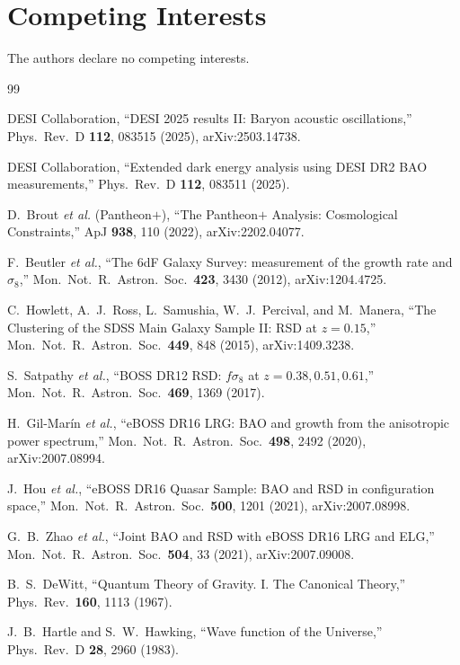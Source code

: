 \documentclass[aps,prd,twocolumn,amsmath,amssymb,nofootinbib,superscriptaddress]{revtex4-2}
\begin{document}
\section*{Competing Interests}
The authors declare no competing interests.

\begin{thebibliography}{99}

DESI Collaboration, ``DESI 2025 results II: Baryon acoustic oscillations,''
Phys.\ Rev.\ D \textbf{112}, 083515 (2025), arXiv:2503.14738.

DESI Collaboration, ``Extended dark energy analysis using DESI DR2 BAO measurements,''
Phys.\ Rev.\ D \textbf{112}, 083511 (2025).

D.~Brout \textit{et al.} (Pantheon$+$), ``The Pantheon$+$ Analysis: Cosmological Constraints,''
ApJ \textbf{938}, 110 (2022), arXiv:2202.04077.

F.~Beutler \textit{et al.}, ``The 6dF Galaxy Survey: measurement of the growth rate and $\sigma_8$,''
Mon.\ Not.\ R.\ Astron.\ Soc.\ \textbf{423}, 3430 (2012), arXiv:1204.4725.

C.~Howlett, A.~J.~Ross, L.~Samushia, W.~J.~Percival, and M.~Manera,
``The Clustering of the SDSS Main Galaxy Sample II: RSD at $z=0.15$,''
Mon.\ Not.\ R.\ Astron.\ Soc.\ \textbf{449}, 848 (2015), arXiv:1409.3238.

S.~Satpathy \textit{et al.},
``BOSS DR12 RSD: $f\sigma_8$ at $z=0.38,0.51,0.61$,''
Mon.\ Not.\ R.\ Astron.\ Soc.\ \textbf{469}, 1369 (2017).

H.~Gil-Mar\'in \textit{et al.},
``eBOSS DR16 LRG: BAO and growth from the anisotropic power spectrum,''
Mon.\ Not.\ R.\ Astron.\ Soc.\ \textbf{498}, 2492 (2020), arXiv:2007.08994.

J.~Hou \textit{et al.},
``eBOSS DR16 Quasar Sample: BAO and RSD in configuration space,''
Mon.\ Not.\ R.\ Astron.\ Soc.\ \textbf{500}, 1201 (2021), arXiv:2007.08998.

G.~B.~Zhao \textit{et al.},
``Joint BAO and RSD with eBOSS DR16 LRG and ELG,''
Mon.\ Not.\ R.\ Astron.\ Soc.\ \textbf{504}, 33 (2021), arXiv:2007.09008.

B.~S.~DeWitt, ``Quantum Theory of Gravity. I. The Canonical Theory,''
Phys.\ Rev.\ \textbf{160}, 1113 (1967).

J.~B.~Hartle and S.~W.~Hawking, ``Wave function of the Universe,''
Phys.\ Rev.\ D \textbf{28}, 2960 (1983).


\end{thebibliography}
\end{document}
